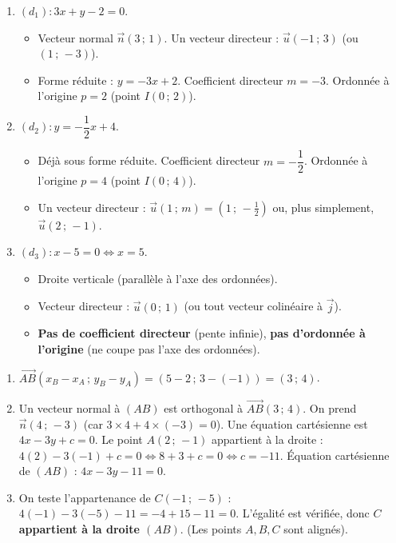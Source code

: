 \documentclass[11pt]{article}
\begin{document}
\begin{corrige}
\begin{enumerate}
\item $(d_1) : 3x + y - 2 = 0$.
\begin{itemize}
\item Vecteur normal $\vec{n}(3\,;\,1)$. Un vecteur directeur : $\vec{u}(-1\,;\,3)$ (ou $(1\,;\,-3)$).
\item Forme réduite : $y = -3x + 2$. Coefficient directeur $m = -3$. Ordonnée à l'origine $p = 2$ (point $I(0\,;\,2)$).
\end{itemize}
\item $(d_2) : y = -\dfrac{1}{2}x + 4$.
\begin{itemize}
\item Déjà sous forme réduite. Coefficient directeur $m = -\dfrac{1}{2}$. Ordonnée à l'origine $p = 4$ (point $I(0\,;\,4)$).
\item Un vecteur directeur : $\vec{u}(1\,;\,m) = \left(1\,;\,-\frac{1}{2}\right)$ ou, plus simplement, $\vec{u}(2\,;\,-1)$.
\end{itemize}
\item $(d_3) : x - 5 = 0 \iff x = 5$.
\begin{itemize}
\item Droite verticale (parallèle à l'axe des ordonnées).
\item Vecteur directeur : $\vec{u}(0\,;\,1)$ (ou tout vecteur colinéaire à $\vec{j}$).
\item \textbf{Pas de coefficient directeur} (pente infinie), \textbf{pas d'ordonnée à l'origine} (ne coupe pas l'axe des ordonnées).
\end{itemize}
\end{enumerate}
\end{corrige}

\begin{corrige}
\begin{enumerate}
\item $\overrightarrow{AB}(x_B-x_A\,;\,y_B-y_A) = (5-2\,;\,3-(-1)) = (3\,;\,4)$.
\item Un vecteur normal à $(AB)$ est orthogonal à $\overrightarrow{AB}(3\,;\,4)$. On prend $\vec{n}(4\,;\,-3)$ (car $3\times4 + 4\times(-3)=0$).
Une équation cartésienne est $4x - 3y + c = 0$.
Le point $A(2\,;\,-1)$ appartient à la droite : $4(2) - 3(-1) + c = 0 \iff 8 + 3 + c = 0 \iff c = -11$.
Équation cartésienne de $(AB)$ : $\boxed{4x - 3y - 11 = 0}$.
\item On teste l'appartenance de $C(-1\,;\,-5)$ : $4(-1) - 3(-5) - 11 = -4 + 15 - 11 = 0$.
L'égalité est vérifiée, donc \textbf{$C$ appartient à la droite $(AB)$}. (Les points $A,B,C$ sont alignés).
\end{enumerate}
\end{corrige}
\end{document}
